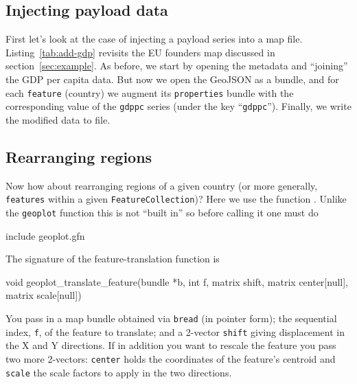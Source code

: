 \documentclass{article}
\begin{document}
\subsection{Injecting payload data}
\label{sec:inject}

First let's look at the case of injecting a payload series into a map
file. Listing~\ref{tab:add-gdp} revisits the EU founders map discussed
in section~\ref{sec:example}.  As before, we start by opening the
metadata and ``joining'' the GDP per capita data. But now we open the
GeoJSON as a bundle, and for each \texttt{feature} (country) we
augment its \texttt{properties} bundle with the corresponding value of
the \texttt{gdppc} series (under the key ``\texttt{gdppc}''). Finally,
we write the modified data to file.

\begin{script}[p]
  \caption{Adding payload data to a map file:
    }
  \label{tab:add-gdp}
\end{script}

\subsection{Rearranging regions}
\label{sec:rearrange}

Now how about rearranging regions of a given country (or more
generally, \texttt{features} within a given
\texttt{FeatureCollection})? Here we use the function
. Unlike the \texttt{geoplot}
function this is not ``built in'' so before calling it one must do
\begin{code}
include geoplot.gfn
\end{code}
The signature of the feature-translation function is
\begin{code}
void geoplot_translate_feature(bundle *b, int f,
                               matrix shift,
                               matrix center[null],
                               matrix scale[null])
\end{code}
You pass in a map bundle obtained via \texttt{bread} (in pointer
form); the sequential index, \texttt{f}, of the feature to translate;
and a 2-vector \texttt{shift} giving displacement in the X and Y
directions. If in addition you want to rescale the feature you pass
two more 2-vectors: \texttt{center} holds the coordinates of the
feature's centroid and \texttt{scale} the scale factors to apply in
the two directions.
\end{document}
